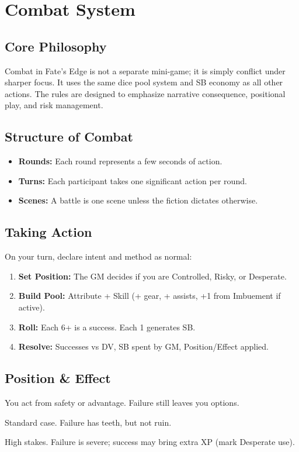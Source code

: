 

\section{Combat System}

\subsection{Core Philosophy}
Combat in Fate's Edge is not a separate mini-game; it is simply conflict under sharper focus. 
It uses the same dice pool system and SB economy as all other actions. 
The rules are designed to emphasize narrative consequence, positional play, and risk management.

\subsection{Structure of Combat}
\begin{itemize}
  \item \textbf{Rounds:} Each round represents a few seconds of action.
  \item \textbf{Turns:} Each participant takes one significant action per round.
  \item \textbf{Scenes:} A battle is one scene unless the fiction dictates otherwise.
\end{itemize}

\subsection{Taking Action}
On your turn, declare intent and method as normal:
\begin{enumerate}
  \item \textbf{Set Position:} The GM decides if you are Controlled, Risky, or Desperate.
  \item \textbf{Build Pool:} Attribute + Skill (+ gear, + assists, +1 from Imbuement if active).
  \item \textbf{Roll:} Each 6+ is a success. Each 1 generates SB.
  \item \textbf{Resolve:} Successes vs DV, SB spent by GM, Position/Effect applied.
\end{enumerate}

\subsection{Position \& Effect}
\begin{description}[leftmargin=1.5em]
  \item[Controlled] You act from safety or advantage. Failure still leaves you options.
  \item[Risky] Standard case. Failure has teeth, but not ruin.
  \item[Desperate] High stakes. Failure is severe; success may bring extra XP (mark Desperate use).
\end{description}
